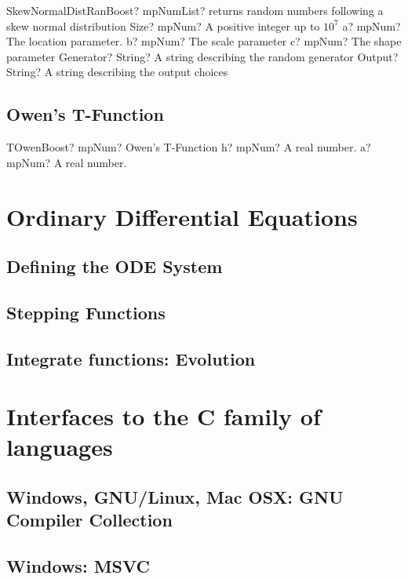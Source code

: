 \documentclass[12pt,a4paper,openany]{book}
\begin{document}
\begin{mpFunctionsExtract}
\mpFunctionSix
{SkewNormalDistRanBoost? mpNumList? returns random numbers following a skew normal distribution}
{Size? mpNum? A positive integer up to $10^7$}
{a? mpNum? The location parameter.}
{b? mpNum? The scale parameter}
{c? mpNum? The shape parameter}
{Generator? String? A string describing the random generator}
{Output? String? A string describing the output choices}
\end{mpFunctionsExtract}

\section{Owen's T-Function}

\begin{mpFunctionsExtract}
\mpFunctionTwo
{TOwenBoost? mpNum? Owen's T-Function}
{h? mpNum? A real number.}
{a? mpNum? A real number.}
\end{mpFunctionsExtract}

\chapter{Ordinary Differential Equations}

\section{Defining the ODE System}

\section{Stepping Functions}

\section{Integrate functions: Evolution}

\chapter{Interfaces to the C family of languages}

\section{Windows, GNU/Linux, Mac OSX: GNU Compiler Collection}

\section{Windows: MSVC}
\end{document}
